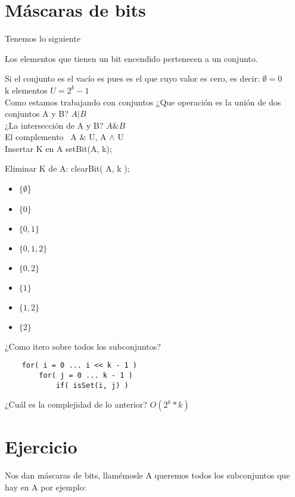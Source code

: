 \section{Máscaras de bits}
Tenemos lo siguiente

Los elementos que tienen un bit encendido pertenecen a un conjunto.

Si el conjunto es el vacío es pues es el que cuyo valor es cero, es decir: \break 
$\emptyset = 0$ \\ 

k elementos \break 
$U=2^{k} - 1$ \\ 

Como estamos trabajando con conjuntos ¿Que operación es la unión de dos conjuntos A y B? \break 
$A | B$ \\ 

¿La intersección de A y B? 
$A \& B$ \\ 

El complemento \break 
~A $\&$ U, A $\wedge$ U\\

Insertar K en A \break
setBit(A, k); \break 

Eliminar K de A: \break 
clearBit( A, k ); \break 

\begin{itemize}
    \item { $\{\emptyset$\} }
    \item { $\{0\}$ }
    \item { $\{0, 1\}$ }
    \item { $\{0, 1, 2\}$ }
    \item { $\{0, 2\}$ }
    \item { $\{1\}$ }
    \item { $\{1, 2\}$ }
    \item { $\{2\}$ }
\end{itemize}

¿Como itero sobre todos los subconjuntos?
\begin{lstlisting}
    for( i = 0 ... i << k - 1 )
        for( j = 0 ... k - 1 )
            if( isSet(i, j) )
\end{lstlisting}

¿Cuál es la complejidad de lo anterior? $O(2^{k} * k)$

\section{Ejercicio}
Nos dan máscaras de bits, llamémosle A queremos todos los subconjuntos que hay en A por ejemplo:

